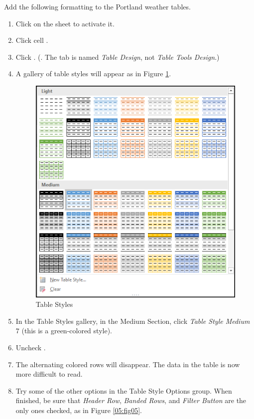 Add the following formatting to the Portland weather tables.

\begin{enumbox}
	\begin{enumerate}
		\item Click on the  sheet to activate it.
		\item Click cell .
		\item Click . (. The tab is named \textit{Table Design}, not \textit{Table Tools Design}.)
		\item A gallery of table styles will appear as in Figure \ref{05:fig04}.

		\begin{figure}[H]
			\centering
			\includegraphics[width=\maxwidth{.75\linewidth}]{gfx/ch05_fig04}
			\caption{Table Styles}
			\label{05:fig04}
		\end{figure}

		\item In the Table Styles gallery, in the Medium Section, click \textit{Table Style Medium} $ 7 $ (this is a green-colored style).
		\item Uncheck .
		\item The alternating colored rows will disappear. The data in the table is now more difficult to read.
		\item Try some of the other options in the Table Style Options group. When finished, be sure that \textit{Header Row}, \textit{Banded Rows}, and \textit{Filter Button} are the only ones checked, as in Figure \ref{05:fig05}.


\end{enumerate}
\end{enumbox}
